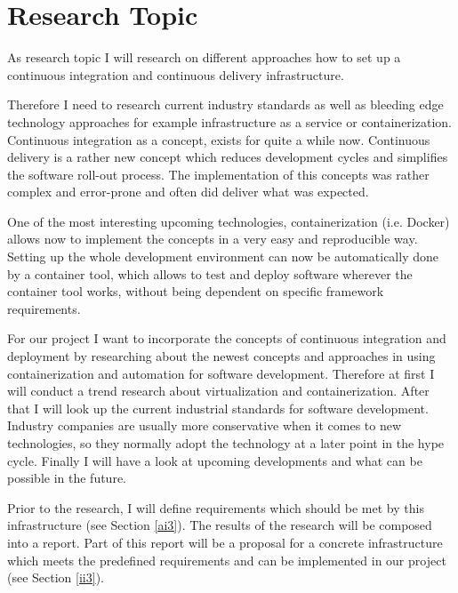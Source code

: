 \section{Research Topic}
\label{sec:research}

As research topic I will research on different approaches how to set up a continuous integration and continuous delivery infrastructure.

Therefore I need to research current industry standards as well as bleeding edge technology approaches for example infrastructure as a service or containerization. Continuous integration as a concept, exists for quite a while now. Continuous delivery is a rather new concept which reduces development cycles and simplifies the software roll-out process. The implementation of this concepts was rather complex and error-prone and often did deliver what was expected.

One of the most interesting upcoming technologies, containerization (i.e. Docker) allows now to implement the concepts in a very easy and reproducible  way. Setting up the whole development environment can now be automatically done by a container tool, which allows to test and deploy software wherever the container tool works, without being dependent on specific framework requirements. 

For our project I want to incorporate the concepts of continuous integration and deployment by researching about the newest concepts and approaches in using containerization and automation for software development. 
Therefore at first I will conduct a trend research about virtualization and containerization. After that I will look up the current industrial standards for software development. Industry companies are usually more conservative when it comes to new technologies, so they normally adopt the technology at a later point in the hype cycle. 
Finally I will have a look at upcoming developments and what can be possible in the future.

Prior to the research, I will define requirements which should be met by this infrastructure (see Section \ref{ai3}).
The results of the research will be composed into a report. Part of this report will be a proposal for a concrete infrastructure which meets the predefined requirements and can be implemented in our project (see Section \ref{ii3}).